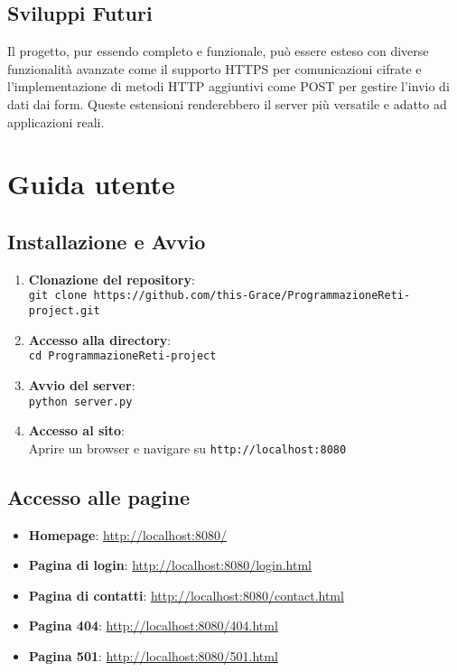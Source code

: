 \documentclass[a4paper,12pt]{report}
\begin{document}
\section{Sviluppi Futuri}

Il progetto, pur essendo completo e funzionale, può essere esteso con diverse funzionalità avanzate come il supporto HTTPS per comunicazioni cifrate e l'implementazione di metodi HTTP aggiuntivi come POST per gestire l'invio di dati dai form. Queste estensioni renderebbero il server più versatile e adatto ad applicazioni reali.

\appendix
\chapter{Guida utente}

\section{Installazione e Avvio}

\begin{enumerate}
    \item \textbf{Clonazione del repository}:\\
    \texttt{git clone https://github.com/this-Grace/ProgrammazioneReti-project.git}

    \item \textbf{Accesso alla directory}:\\
    \texttt{cd ProgrammazioneReti-project}

    \item \textbf{Avvio del server}:\\
    \texttt{python server.py}

    \item \textbf{Accesso al sito}:\\
    Aprire un browser e navigare su \texttt{http://localhost:8080}
\end{enumerate}

\section{Accesso alle pagine}

\begin{itemize}
    \item \textbf{Homepage}: \url{http://localhost:8080/}
    \item \textbf{Pagina di login}: \url{http://localhost:8080/login.html}
    \item \textbf{Pagina di contatti}: \url{http://localhost:8080/contact.html}
    \item \textbf{Pagina 404}: \url{http://localhost:8080/404.html}
    \item \textbf{Pagina 501}: \url{http://localhost:8080/501.html}
\end{itemize}
\end{document}
